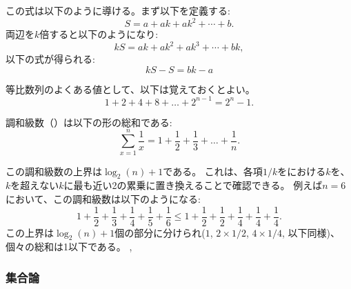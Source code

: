 この式は以下のように導ける。まず以下を定義する:
\[ S = a + ak + ak^2 + \cdots + b .\]
両辺を$k$倍すると以下のようになり:
\[ kS = ak + ak^2 + ak^3 + \cdots + bk,\]
以下の式が得られる:
\[ kS-S = bk-a\]

等比数列のよくある値として、以下は覚えておくとよい。
\[1+2+4+8+\ldots+2^{n-1}=2^n-1.\]

\begin{comment}
\index{harmonic sum}

A \key{harmonic sum} is a sum of the form
\[ \sum_{x=1}^n \frac{1}{x} = 1+\frac{1}{2}+\frac{1}{3}+\ldots+\frac{1}{n}.\]

An upper bound for a harmonic sum is $\log_2(n)+1$.
Namely, we can
modify each term $1/k$ so that $k$ becomes
the nearest power of two that does not exceed $k$.
For example, when $n=6$, we can estimate
the sum as follows:
\[ 1+\frac{1}{2}+\frac{1}{3}+\frac{1}{4}+\frac{1}{5}+\frac{1}{6} \le
1+\frac{1}{2}+\frac{1}{2}+\frac{1}{4}+\frac{1}{4}+\frac{1}{4}.\]
This upper bound consists of $\log_2(n)+1$ parts
($1$, $2 \cdot 1/2$, $4 \cdot 1/4$, etc.),
and the value of each part is at most 1.
\end{comment}


調和級数（）は以下の形の総和である:
\[ \sum_{x=1}^n \frac{1}{x} = 1+\frac{1}{2}+\frac{1}{3}+\ldots+\frac{1}{n}.\]

この調和級数の上界は$\log_2(n)+1$である。
これは、各項$1/k$をにおける$k$を、$k$を超えない$k$に最も近い2の累乗に置き換えることで確認できる。
例えば$n=6$において、この調和級数は以下のようになる:
\[ 1+\frac{1}{2}+\frac{1}{3}+\frac{1}{4}+\frac{1}{5}+\frac{1}{6} \le
1+\frac{1}{2}+\frac{1}{2}+\frac{1}{4}+\frac{1}{4}+\frac{1}{4}.\]
この上界は$\log_2(n)+1$個の部分に分けられ($1$, $2 \times 1/2$, $4 \times 1/4$, 以下同様)、個々の総和は1以下である。
,

\begin{comment}
\subsubsection{Set theory}
\end{comment}

\subsubsection{集合論}



